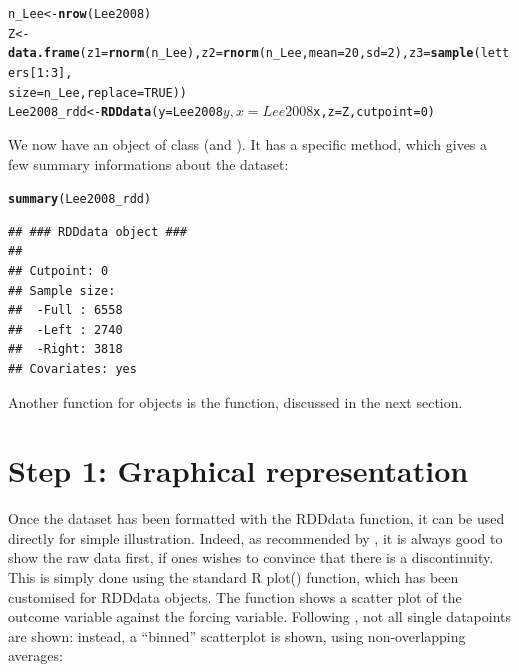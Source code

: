 \documentclass[english,nojss]{jss}\usepackage{graphicx, color}
\makeatletter
\newcommand{\hlfunctioncall}[1]{\textcolor[rgb]{0.501960784313725,0,0.329411764705882}{\textbf{#1}}}%
\newenvironment{kframe}{%
 \def\at@end@of@kframe{}%
 \ifinner\ifhmode%
  \def\at@end@of@kframe{\end{minipage}}%
  \begin{minipage}{\columnwidth}%
 \fi\fi%
 \def\FrameCommand##1{\hskip\@totalleftmargin \hskip-\fboxsep
 \colorbox{shadecolor}{##1}\hskip-\fboxsep
     \hskip-\linewidth \hskip-\@totalleftmargin \hskip\columnwidth}%
 \MakeFramed {\advance\hsize-\width
   \@totalleftmargin\z@ \linewidth\hsize
   \@setminipage}}%
 {\par\unskip\endMakeFramed%
 \at@end@of@kframe}
\newenvironment{knitrout}{}{} %
\makeatother
\begin{document}
\begin{knitrout}
\color{fgcolor}\begin{kframe}
\begin{alltt}
n_Lee <- \hlfunctioncall{nrow}(Lee2008)
Z <- \hlfunctioncall{data.frame}(z1 = \hlfunctioncall{rnorm}(n_Lee), z2 = \hlfunctioncall{rnorm}(n_Lee, mean = 20, sd = 2), z3 = \hlfunctioncall{sample}(letters[1:3], 
    size = n_Lee, replace = TRUE))
Lee2008_rdd <- \hlfunctioncall{RDDdata}(y = Lee2008$y, x = Lee2008$x, z = Z, cutpoint = 0)
\end{alltt}
\end{kframe}
\end{knitrout}


We now have an object  of class 
(and ). It has a specific  method,
which gives a few summary informations about the dataset:

\begin{knitrout}
\color{fgcolor}\begin{kframe}
\begin{alltt}
\hlfunctioncall{summary}(Lee2008_rdd)
\end{alltt}
\begin{verbatim}
## ### RDDdata object ###
## 
## Cutpoint: 0 
## Sample size: 
## 	-Full : 6558 
## 	-Left : 2740 
## 	-Right: 3818
## Covariates: yes
\end{verbatim}
\end{kframe}
\end{knitrout}


Another function for  objects is the 
function, discussed in the next section. 


\section{Step 1: Graphical representation}


Once the dataset has been formatted with the RDDdata function, it
can be used directly for simple illustration. Indeed, as recommended
by \citet{LeeLemieux2010}, it is always good to show the raw data
first, if ones wishes to convince that there is a discontinuity. This
is simply done using the standard R plot() function, which has been
customised for RDDdata objects. The function shows a scatter plot
of the outcome variable against the forcing variable. Following \citet{LeeLemieux2010},
not all single datapoints are shown: instead, a ``binned'' scatterplot
is shown, using non-overlapping averages:
\end{document}
